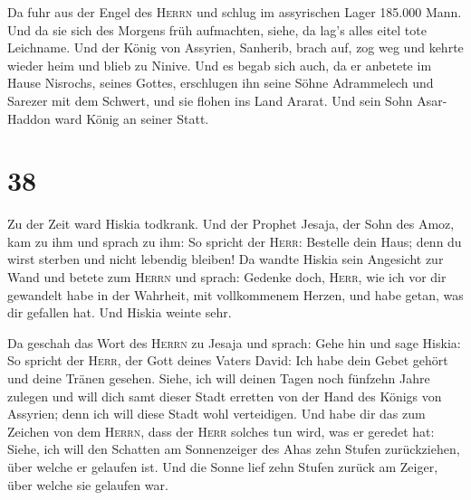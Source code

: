  Da fuhr aus der Engel des \textsc{Herrn} und schlug im
assyrischen Lager 185.000 Mann. Und da sie sich des Morgens früh
aufmachten, siehe, da lag's alles eitel tote Leichname. 
Und der König von Assyrien, Sanherib, brach auf, zog weg und kehrte
wieder heim und blieb zu Ninive.  Und es begab sich auch,
da er anbetete im Hause Nisrochs, seines Gottes, erschlugen ihn seine
Söhne Adrammelech und Sarezer mit dem Schwert, und sie flohen ins Land
Ararat. Und sein Sohn Asar-Haddon ward König an seiner Statt.

\hypertarget{section-37}{%
\section{38}\label{section-37}}

 Zu der Zeit ward Hiskia todkrank. Und der Prophet Jesaja,
der Sohn des Amoz, kam zu ihm und sprach zu ihm: So spricht der
\textsc{Herr}: Bestelle dein Haus; denn du wirst sterben und nicht
lebendig bleiben!  Da wandte Hiskia sein Angesicht zur
Wand und betete zum \textsc{Herrn}  und sprach: Gedenke
doch, \textsc{Herr}, wie ich vor dir gewandelt habe in der Wahrheit, mit
vollkommenem Herzen, und habe getan, was dir gefallen hat. Und Hiskia
weinte sehr.

 Da geschah das Wort des \textsc{Herrn} zu Jesaja und
sprach:  Gehe hin und sage Hiskia: So spricht der
\textsc{Herr}, der Gott deines Vaters David: Ich habe dein Gebet gehört
und deine Tränen gesehen. Siehe, ich will deinen Tagen noch fünfzehn
Jahre zulegen  und will dich samt dieser Stadt erretten
von der Hand des Königs von Assyrien; denn ich will diese Stadt wohl
verteidigen.  Und habe dir das zum Zeichen von dem
\textsc{Herrn}, dass der \textsc{Herr} solches tun wird, was er geredet
hat:  Siehe, ich will den Schatten am Sonnenzeiger des
Ahas zehn Stufen zurückziehen, über welche er gelaufen ist. Und die
Sonne lief zehn Stufen zurück am Zeiger, über welche sie gelaufen war.

